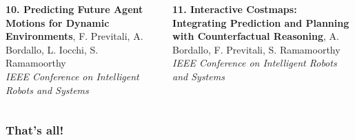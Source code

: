 \begin{frame}
\begin{columns}[t]
		\vspace{0.15cm}
		
		\textbf{10. Predicting Future Agent Motions for Dynamic Environments}, F. Previtali, A.
		Bordallo, L. Iocchi, S. Ramamoorthy \\
		\emph{IEEE Conference on Intelligent Robots and Systems}
		
		\vspace{0.15cm}
		
		\textbf{11. Interactive Costmaps: Integrating Prediction and Planning with Counterfactual
		Reasoning}, A. Bordallo, F. Previtali, S. Ramamoorthy \\
		\emph{IEEE Conference on Intelligent Robots and Systems}
	\end{columns}
\end{frame}

\logo{}

\begin{frame}
	\frametitle{That's all!}
	
	\begin{figure}[!h]
		\centering
	\end{figure}
\end{frame}
